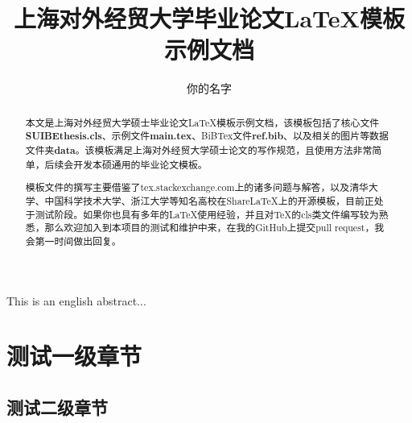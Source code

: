 \documentclass{SUIBEthesis}
\begin{document}
\title{上海对外经贸大学毕业论文LaTeX模板示例文档}
\author{你的名字}


\maketitle

\newpage

\begin{abstract}
  本文是上海对外经贸大学硕士毕业论文\LaTeX 模板示例文档，该模板包括了核心文件\textbf{SUIBEthesis.cls}、示例文件\textbf{main.tex}、BiBTex文件\textbf{ref.bib}、以及相关的图片等数据文件夹\textbf{data}。该模板满足上海对外经贸大学硕士论文的写作规范，且使用方法非常简单，后续会开发本硕通用的毕业论文模板。

  模板文件的撰写主要借鉴了tex.stackexchange.com上的诸多问题与解答，以及清华大学、中国科学技术大学、浙江大学等知名高校在ShareLaTeX上的开源模板，目前正处于测试阶段。如果你也具有多年的\LaTeX 使用经验，并且对\TeX 的cls类文件编写较为熟悉，那么欢迎加入到本项目的测试和维护中来，在我的GitHub上提交pull request，我会第一时间做出回复。

  
  
\end{abstract}


\newpage
\begin{enabstract}
  
\end{enabstract}

This is an english abstract...



\newpage
\pagestyle{empty}
\tableofcontents
\pagestyle{empty}
\thispagestyle{coverpage}


\newpage
\setcounter{page}{1}
\pagestyle{mainpage}





\section{测试一级章节}
\subsection{测试二级章节}
\end{document}
